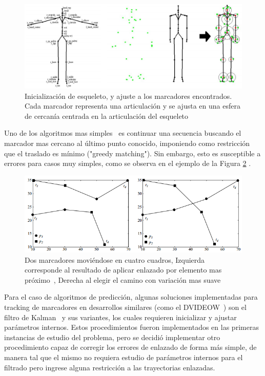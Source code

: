 \begin{figure}[ht!]
\begin{center}
\includegraphics[scale=0.6]{img/Tracking/01_skeleton_fitting_Herda.png}
\end{center}
\caption{Inicialización de esqueleto, y ajuste a los marcadores encontrados. Cada marcador representa una articulación y se ajusta en una esfera de cercanía centrada en la articulación del esqueleto}
\label{skeleton_fitting_herda}
\end{figure}

Uno de los algoritmos mas simples~\cite{survey_tracking} es continuar una secuencia buscando el marcador mas cercano al último punto conocido, imponiendo como restricción que el traslado es mínimo ("greedy matching"). Sin embargo, esto es susceptible a errores para casos muy simples, como se observa en el ejemplo de la Figura \ref{greedy_matching} .

\begin{figure}[ht!]
\begin{center}
\includegraphics[scale=0.8]{img/Tracking/01_Greedy_Matching.png}
\end{center}
\caption{Dos marcadores moviéndose en cuatro cuadros, Izquierda corresponde al resultado de aplicar enlazado por elemento mas próximo~\cite{survey_tracking}, Derecha al elegir el camino con variación mas suave}
\label{greedy_matching}
\end{figure}

Para el caso de algoritmos de predicción, algunas soluciones implementadas para tracking de marcadores en desarrollos similares (como el DVIDEOW~\cite{figueroa2003flexible}) son el filtro de Kalman~\cite{kalman} y sus variantes, los cuales requieren inicializar y ajustar parámetros internos. Estos procedimientos fueron implementados en las primeras instancias de estudio del problema, pero se decidió implementar otro procedimiento capaz de corregir los errores de enlazado de forma más simple, de manera tal que el mismo no requiera estudio de parámetros internos para el filtrado pero ingrese alguna restricción a las trayectorias enlazadas.
\\ 

